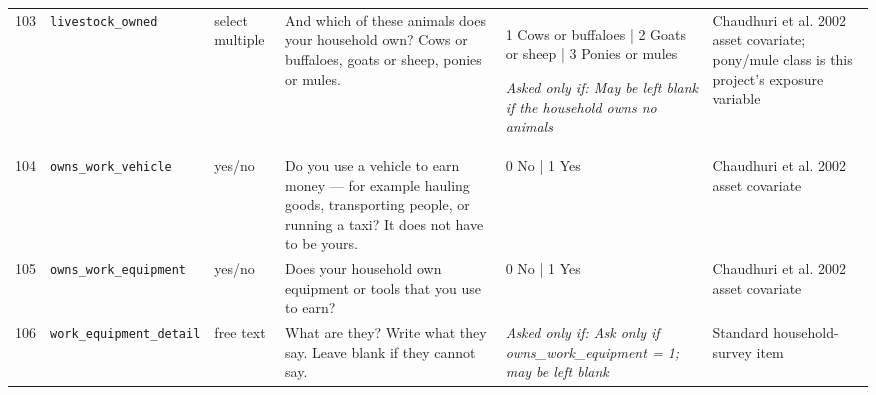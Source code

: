 \documentclass[9pt,a4paper,landscape]{article}
\begin{document}
\begin{longtable}{@{}p{0.5cm}p{3.3cm}p{1.7cm}p{7.3cm}p{5.6cm}p{5.4cm}@{}}
\footnotesize 103 & \footnotesize\texttt{livestock\_owned} & \scriptsize select multiple & \footnotesize And which of these animals does your household own? Cows or buffaloes, goats or sheep, ponies or mules.\par\vspace{1pt}{\footnotesize\color{hdr}{\hifont और इनमें से कौन-कौन से जानवर आपके घर में हैं? गाय या भैंस, बकरी या भेड़, घोड़े या खच्चर।}} & \scriptsize 1 Cows or buffaloes | 2 Goats or sheep | 3 Ponies or mules\par\vspace{1pt}\textit{Asked only if: May be left blank if the household owns no animals} & \scriptsize Chaudhuri et al. 2002 asset covariate; pony/mule class is this project's exposure variable\\
\footnotesize 104 & \footnotesize\texttt{owns\_work\_vehicle} & \scriptsize yes/no & \footnotesize Do you use a vehicle to earn money — for example hauling goods, transporting people, or running a taxi? It does not have to be yours.\par\vspace{1pt}{\footnotesize\color{hdr}{\hifont क्या आपके घर की अपनी गाड़ी है जिससे आप कमाते हैं (जैसे जीप, ट्रक या टैक्सी)?}} & \scriptsize 0 No | 1 Yes & \scriptsize Chaudhuri et al. 2002 asset covariate\\
\footnotesize 105 & \footnotesize\texttt{owns\_work\_equipment} & \scriptsize yes/no & \footnotesize Does your household own equipment or tools that you use to earn?\par\vspace{1pt}{\footnotesize\color{hdr}{\hifont क्या आपके घर के पास काम के औज़ार या मशीन है जिससे आप कमाते हैं?}} & \scriptsize 0 No | 1 Yes & \scriptsize Chaudhuri et al. 2002 asset covariate\\
\footnotesize 106 & \footnotesize\texttt{work\_equipment\_detail} & \scriptsize free text & \footnotesize What are they? Write what they say. Leave blank if they cannot say.\par\vspace{1pt}{\footnotesize\color{hdr}{\hifont वे क्या हैं? जैसा वे बताएँ वैसा लिख लीजिए। न बता पाएँ तो खाली छोड़ दीजिए।}} & \scriptsize \textit{Asked only if: Ask only if owns\_work\_equipment = 1; may be left blank} & \scriptsize Standard household-survey item\\
\bottomrule\end{longtable}\vspace{6pt}
\\[3pt]
\end{document}
